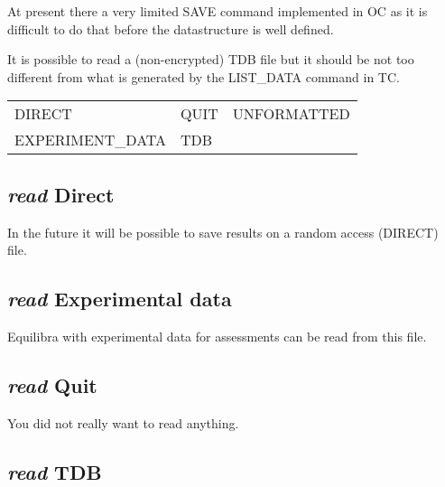 \documentclass[12pt]{article}
\begin{document}
At present there a very limited SAVE command implemented in OC as it
is difficult to do that before the datastructure is well defined.

It is possible to read a (non-encrypted) TDB file but it should be not
too different from what is generated by the LIST\_DATA command in TC.

\begin{tabular}{lll}
 DIRECT          & QUIT    &         UNFORMATTED\\
 EXPERIMENT\_DATA & TDB\\
\end{tabular}

\subsection{{\em read} Direct}

In the future it will be possible to save results on a random access
(DIRECT) file.

\subsection{{\em read} Experimental data}

Equilibra with experimental data for assessments can be read from this
file.

\subsection{{\em read} Quit}

You did not really want to read anything.

\subsection{{\em read} TDB}
\end{document}
